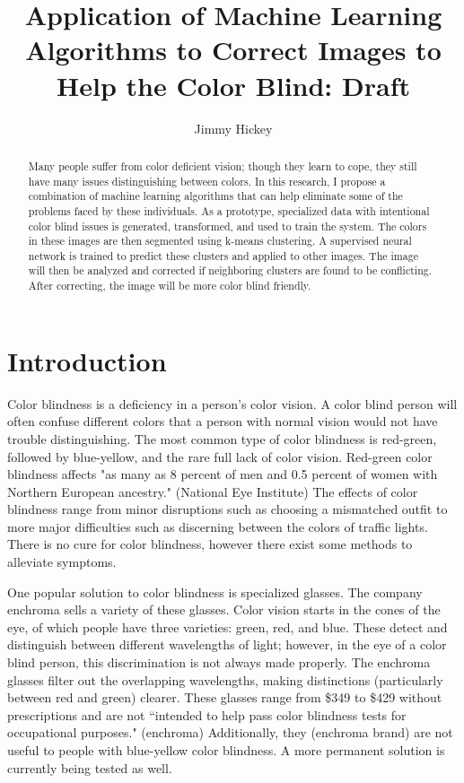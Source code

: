 \documentclass[12pt]{article}
\title{
Application of Machine Learning Algorithms to Correct Images to Help the Color Blind: Draft
}
\author{Jimmy Hickey}
\begin{document}
\maketitle
\doublespacing

\begin{abstract}
Many people suffer from color deficient vision; though they learn to cope, they still have many issues distinguishing between colors. In this research, I propose a combination of machine learning algorithms that can help eliminate some of the problems faced by these individuals. As a prototype, specialized data with intentional color blind issues is generated, transformed, and used to train the system. The colors in these images are then segmented using k-means clustering. A supervised neural network is trained to predict these clusters and applied to other images. The image will then be analyzed and corrected if neighboring clusters are found to be conflicting. After correcting, the image will be more color blind friendly.

\end{abstract}

\section{Introduction}

Color blindness is a deficiency in a person's color vision. A color blind person will often confuse different colors that a person with normal vision would not have trouble distinguishing. The most common type of color blindness is red-green, followed by blue-yellow, and the rare full lack of color vision. Red-green color blindness affects "as many as 8 percent of men and 0.5 percent of women with Northern European ancestry." (National Eye Institute) The effects of color blindness range from minor disruptions such as choosing a mismatched outfit to more major difficulties such as discerning between the colors of traffic lights.
There is no cure for color blindness, however there exist some methods to alleviate symptoms. 

One popular solution to color blindness is specialized glasses. The company enchroma sells a variety of these glasses. Color vision starts in the cones of the eye, of which people have three varieties: green, red, and blue. These detect and distinguish between different wavelengths of light; however, in the eye of a color blind person, this discrimination is not always made properly. The enchroma glasses filter out the overlapping wavelengths, making distinctions (particularly between red and green) clearer. These glasses range from \$349 to \$429 without prescriptions and are not ``intended to help pass color blindness tests for occupational purposes." (enchroma) Additionally, they (enchroma brand) are not useful to people with blue-yellow color blindness. A more permanent solution is currently being tested as well.
\end{document}
